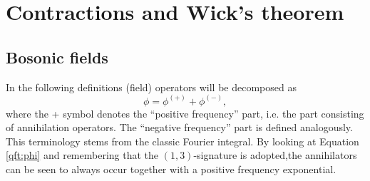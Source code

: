 \section{Contractions and Wick's theorem}
\subsection{Bosonic fields}

    In the following definitions (field) operators will be decomposed as \[\phi = \phi^{(+)} + \phi^{(-)},\] where the + symbol denotes the ``positive frequency'' part, i.e. the part consisting of annihilation operators. The ``negative frequency'' part is defined analogously. This terminology stems from the classic Fourier integral. By looking at Equation \eqref{qft:phi} and remembering that the $(1,3)$-signature is adopted,the annihilators can be seen to always occur together with a positive frequency exponential.



